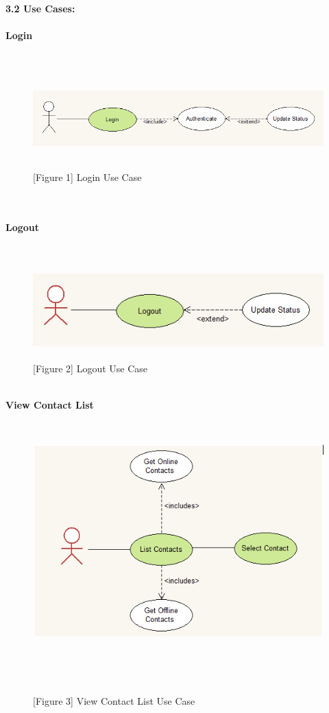 \documentclass[29pt,a4paper]{moderncv}
\begin{document}
	\noindent \left\textbf{3.2 Use Cases: }\\
	\vspace{4mm}
		\\ \noindent \left\textbf{Login}\\
		\\ \begin{figure}
					\centering
					\\ \includegraphics[width=6.0in, height=1.2in]{./loginCase.png}
					\\\caption{[Figure 1] Login Use Case}
			\end{figure}\\
			
		\\ \noindent \left\textbf{Logout}\\
			\\ \begin{figure}
						\centering
						\\ \includegraphics[width=6.0in, height=1.2in]{./ucLogout.png}
						\\\caption{[Figure 2] Logout Use Case}
				\end{figure}\\
\newpage				
		\noindent \left\textbf{View Contact List}\\
		\begin{figure}
					\centering
					\\ \includegraphics[width=6.0in, height=3.2in]{./viewContactsCase.png} \\
					\\\caption{[Figure 3] View Contact List Use Case} \\
		\end{figure}\\ 
				
\end{document}
